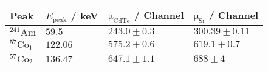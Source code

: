 	\begin{tabular}{|p{3cm}|p{3cm}|p{3cm}|p{3cm}|}
		\hline
		\rowcolor{tabcolor}
		Peak   & $E_\mathrm{peak}$ / keV & $\mathrm{\mu_{CdTe}}$ / Channel & $\mathrm{\mu_{Si}}$ / Channel\\ 
		\hline
		$^{241}\mathrm{Am}$ & $59.5$ & $243.0 \pm 0.3$ & $300.39 \pm 0.11$ \\ 
		$^{57}\mathrm{Co}_1$ & $122.06$ & $575.2 \pm 0.6$ & $619.1 \pm 0.7$ \\ 
		$^{57}\mathrm{Co}_2$ & $136.47$ & $647.1 \pm 1.1$ & $688 \pm 4$ \\ 
		\hline
	\end{tabular}
